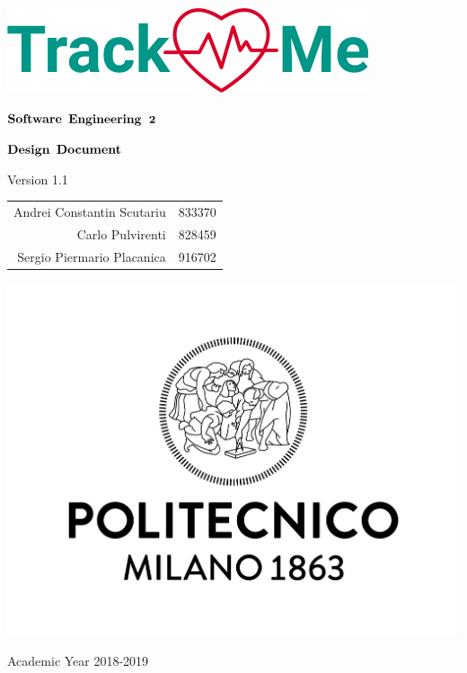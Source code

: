 \documentclass[oneside]{article}
\date{}
\title{}
\begin{document}

\thispagestyle{empty} %
\begin{center}
	\includegraphics[scale=0.8]{images/mockup/logo2.png}



	\vspace{3cm}

	\large $\bf \large Software$ $\bf Engineering$ $\bf 2$

	\vspace{3mm}

	\LARGE $\bf Design$  $\bf Document$

	\vspace{2mm}
	\small Version 1.1

	\vspace{1cm}

	\begin{tabular}{r|l}
		\large Andrei Constantin Scutariu & \large 833370\\
		\large Carlo Pulvirenti & \large 828459\\
		\large Sergio Piermario Placanica & \large 916702\\
	\end{tabular}

	\vspace{3cm}

	\includegraphics[scale=0.15]{images/logoPolimi.jpg}

	\vspace{3mm}
	Academic Year 2018-2019


	\end{center}
\end{document}
